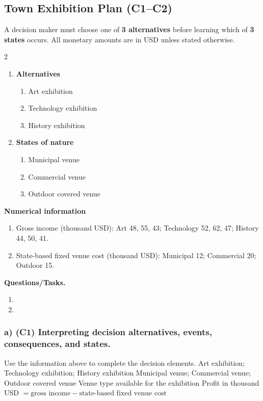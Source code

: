 \subsection{Town Exhibition Plan (C1--C2)}
\label{sec:problem8-town-exhibition-plan-c1-c2}
A decision maker must choose one of \textbf{3 alternatives} before learning which of \textbf{3 states} occurs. All monetary amounts are in USD unless stated otherwise.
\begin{multicols}{2}
\begin{enumerate}[label=\arabic*.]
 \item \textbf{Alternatives}
 \begin{enumerate}[label=\roman*)]
  \item Art exhibition
  \item Technology exhibition
  \item History exhibition
 \end{enumerate}
 \item \textbf{States of nature}
 \begin{enumerate}[label=\roman*)]
  \item Municipal venue
  \item Commercial venue
  \item Outdoor covered venue
 \end{enumerate}
\end{enumerate}
\end{multicols}
 \textbf{Numerical information}
 \begin{enumerate}[label=\roman*)]
  \item Gross income (thousand USD): Art 48, 55, 43; Technology 52, 62, 47; History 44, 50, 41.
  \item State-based fixed venue cost (thousand USD): Municipal 12; Commercial 20; Outdoor 15.
 \end{enumerate}


\textbf{Questions/Tasks.}
\begin{enumerate}[label=\textbf{\alph*)}]
 \item {}
 \item {}
\end{enumerate}
\subsubsection*{a) \textbf{(C1)} Interpreting decision alternatives, events, consequences, and states.}
\label{subsec:problem8-town-exhibition-plan-c1}
Use the information above to complete the decision elements.
\DecisionElementsTable
{Art exhibition; Technology exhibition; History exhibition}
{Municipal venue; Commercial venue; Outdoor covered venue}
{Venue type available for the exhibition}
{Profit in thousand USD $= \text{gross income} - \text{state-based fixed venue cost}$}
